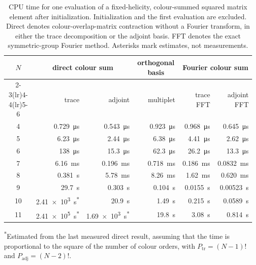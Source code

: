 \begin{table}[t]
  \caption{CPU time for one evaluation of a fixed-helicity, colour-summed
  squared matrix element after initialization.  Initialization and the first
  evaluation are excluded.  Direct denotes colour-overlap-matrix contraction
  without a Fourier transform, in either the trace decomposition or the
  adjoint basis.  FFT denotes the exact symmetric-group Fourier method.
  Asterisks mark estimates, not measurements.}
  \label{tab:evaluation-times}
  \centering
  \setlength{\tabcolsep}{5.5pt}
  \begin{tabular}{@{}c rr r rr@{}}
  \toprule
  $N$ & \multicolumn{2}{c}{direct colour sum} &
  \multicolumn{1}{c}{orthogonal basis} &
  \multicolumn{2}{c}{Fourier colour sum} \\
  \cmidrule(lr){2-3}\cmidrule(lr){4-4}\cmidrule(lr){5-6}
  & trace & adjoint & multiplet & trace FFT & adjoint FFT \\
  \midrule
  4  & \SI{0.729}{\micro\second} & \SI{0.543}{\micro\second} & \SI{0.923}{\micro\second} & \SI{0.968}{\micro\second} & \SI{0.645}{\micro\second} \\
  5  & \SI{6.23}{\micro\second}  & \SI{2.44}{\micro\second}  & \SI{6.38}{\micro\second}  & \SI{4.41}{\micro\second}  & \SI{2.62}{\micro\second} \\
  6  & \SI{138}{\micro\second}   & \SI{15.3}{\micro\second}  & \SI{62.3}{\micro\second}  & \SI{26.2}{\micro\second}  & \SI{13.3}{\micro\second} \\
  7  & \SI{6.16}{\milli\second}  & \SI{0.196}{\milli\second} & \SI{0.718}{\milli\second} & \SI{0.186}{\milli\second} & \SI{0.0832}{\milli\second} \\
  8  & \SI{0.381}{\second}       & \SI{5.78}{\milli\second}  & \SI{8.26}{\milli\second}  & \SI{1.62}{\milli\second}  & \SI{0.620}{\milli\second} \\
  9  & \SI{29.7}{\second}        & \SI{0.303}{\second}       & \SI{0.104}{\second}       & \SI{0.0155}{\second}      & \SI{0.00523}{\second} \\
  10 & \SI{2.41e3}{\second}\textsuperscript{*} & \SI{20.9}{\second} & \SI{1.49}{\second} & \SI{0.215}{\second} & \SI{0.0589}{\second} \\
  11 & \SI{2.41e5}{\second}\textsuperscript{*} & \SI{1.69e3}{\second}\textsuperscript{*} & \SI{19.8}{\second} & \SI{3.08}{\second} & \SI{0.814}{\second} \\
  \bottomrule
  \end{tabular}

  \vspace{0.5ex}
  \begin{minipage}{0.97\textwidth}
  \footnotesize
  \textsuperscript{*}Estimated from the last measured direct result, assuming
  that the time is proportional to the square of the number of
  colour orders, with $P_{\mathrm{tr}}=(N-1)!$ and
  $P_{\mathrm{adj}}=(N-2)!$.
  \end{minipage}
\end{table}
